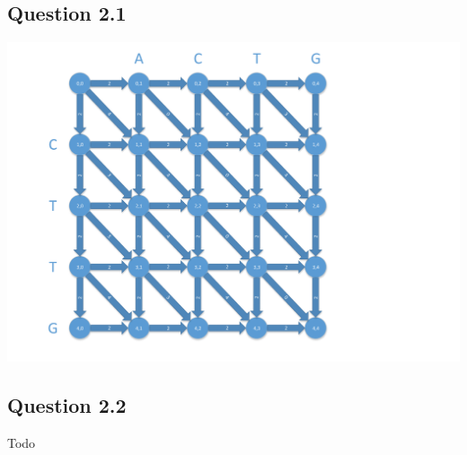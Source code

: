 \documentclass[5pt,a4paper]{report}
\begin{document}
	\subsection*{Question 2.1}
	\includegraphics[scale=0.20]{Q2-1}
	\subsection*{Question 2.2}
	Todo
\end{document}
